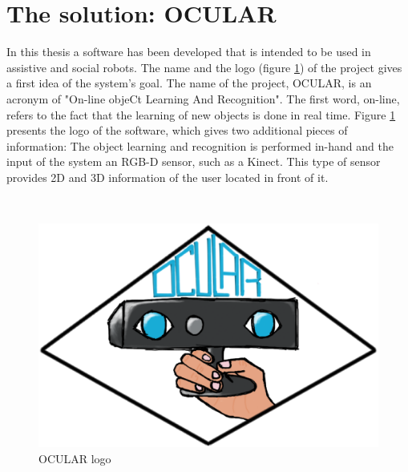 \section{The solution: OCULAR}

In this thesis a software has been developed that is intended to be used in assistive and social robots.
The name and the logo (figure \ref{ocular_logo}) of the project gives a first idea of the system's goal. 
The name of the project, OCULAR, is an acronym of "On-line objeCt Learning And Recognition". 
The first word, on-line, refers to the fact that the learning of new objects is done in real time. %
Figure \ref{ocular_logo} presents the logo of the software, which gives two additional pieces of information: 
The object learning and recognition is performed in-hand and the input of the system an RGB-D sensor, such as a Kinect. 
This type of sensor provides 2D and 3D information of the user located in front of it. 

\\

\begin{figure}[H]
	\begin{center}
\includegraphics[scale=0.3]{img/ocular_logo.eps}
	\caption[OCULAR Logo]{OCULAR logo}
		\label{ocular_logo}
	\end{center}
\end{figure}

